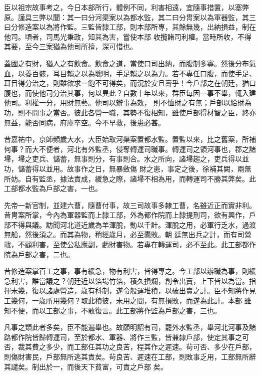 \begin{pinyinscope}
 臣以祖宗故事考之，今日本部所行，體例不同，利害相遠，宜隨事措置，以塞弊原。謹具三弊以聞：其一曰分河渠案以為都水監，其二曰分冑案以為軍器監，其三曰分修造案以為將作監。三監皆隸工部，則本部所專，其餘無幾，出納損益，制在他司。頃者，司馬光秉政，知其為害，嘗使本部
 收攬諸司利權。當時所收，不得其要，至今三案猶為他司所擅，深可惜也。



 蓋國之有財，猶人之有飲食。飲食之道，當使口司出納，而腹制多寡。然後分布氣血，以養百骸，耳目賴之以為聰明，手足賴之以為力。若不專任口腹，而使手足、耳目得分治之，則雖欲求一飽不可得矣，而況於安且壽乎！今戶部之在朝廷，猶口腹也，而使他司分治其事，何以異此？自數十年以來，群臣每因一事不舉，輒入建他司。利權一分，用財無藝。他司以辦事為效，
 則不恤財之有無；戶部以給財為功，則不問事之當否。彼此各營一職，其勢不復相知，雖使戶部得材智之臣，終亦無益，能否同病，府庫卒空。今不早救，後患必甚。



 昔嘉祐中，京師頻歲大水，大臣始取河渠案置都水監。置監以來，比之舊案，所補何事？而大不便者，河北有外監丞，侵奪轉運司職事。轉運司之領河事也，郡之諸埽，埽之吏兵、儲蓄，無事則分，有事則合。水之所向，諸埽趨之，吏兵得以並功，儲蓄得以並用。故事作之日，無暴斂傷
 財之患，事定之後，徐補其闕，兩無所妨。自有監丞，據法責成，緩急之際，諸埽不相為用，而轉運司不勝其弊矣。此工部都水監為戶部之害，一也。



 先帝一新官制，並建六曹，隨曹付事，故三司故事多隸工曹，名雖近正而實非利。昔冑案所掌，今內為軍器監而上隸工部，外為都作院而上隸提刑司，欲有興作，戶部不得與議。訪聞河北道近歲為羊渾脫，動以千計。渾脫之用，必軍行乏水，過渡無船，然後須之。而其為物，稍經歲月，必至蠹敗。朝
 廷無出兵之計，而有司營戢，不顧利害，至使公私應副，虧財害物。若專在轉運司，必不至此。此工部都作院為戶部之害，二也。



 昔修造案掌百工之事，事有緩急，物有利害，皆得專之。今工部以辦職為事，則緩急利害，誰當議之？朝廷近以箔場竹箔，積久損爛，創令出賣，上下皆以為當。指揮未幾，復以諸處營造，歲有科制，遂令般運堆積，以破出賣之計。臣不知將作見工幾何，一歲所用幾何？取此積彼，未用之間，有無損敗，而遂為此計。本部
 雖知不便，而以工部之事，不敢復言。此工部將作監為戶部之害，三也。



 凡事之類此者多矣，臣不能遍舉也。故願明詔有司，罷外水監丞，舉河北河事及諸路都作院皆歸轉運司，至於都水、軍器、將作三監，皆兼隸戶部，使定其事之可否，裁其費之多少，而工部任其功之良苦，程其作之遲速。茍可否、多少在戶部，則傷財害民，戶部無所逃其責矣。茍良苦、遲速在工部，則敗事乏用，工部無所辭其譴矣。制出於一，而後天下貧富，可責之戶部
 矣。




\end{pinyinscope}
